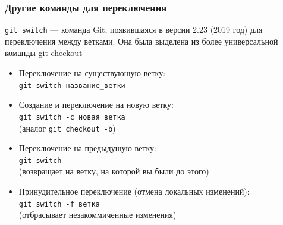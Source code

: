 \documentclass[9pt, aspectratio=1610]{beamer}
\begin{document}
\begin{frame}[fragile]\frametitle{Другие команды для переключения}
	
	\begin{alertblock} {\Verb|git switch| --- }
		команда Git, появившаяся в версии 2.23 (2019 год) для переключения между ветками. Она была выделена из более универсальной команды git checkout
	\end{alertblock}
	
	\begin{itemize}
		\item Переключение на существующую ветку:\\
		\Verb|git switch название_ветки|
		
		\item Создание и переключение на новую ветку:\\
		\Verb |git switch -c новая_ветка|\\
		(аналог \Verb|git checkout -b|)
		
		\item Переключение на предыдущую ветку:\\
		\Verb|git switch -|\\
		(возвращает на ветку, на которой вы были до этого)
		
		\item Принудительное переключение (отмена локальных изменений):\\
		\Verb|git switch -f ветка|\\
		(отбрасывает незакоммиченные изменения)
	\end{itemize}
	

	
	
\end{frame}
\end{document}
